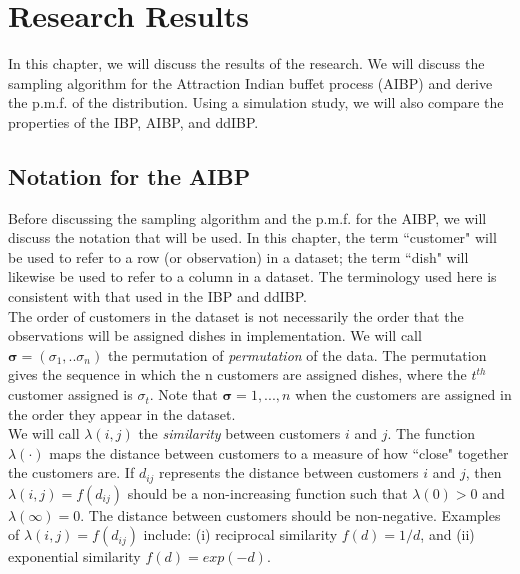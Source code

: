 \chapter{Research Results}
In this chapter, we will discuss the results of the research. We will discuss
the sampling algorithm for the Attraction Indian buffet process (AIBP) and
derive the p.m.f. of the distribution. Using a simulation study, we will also
compare the properties of the IBP, AIBP, and ddIBP.\\

\section{Notation for the AIBP}
Before discussing the sampling algorithm and the p.m.f. for the AIBP,  we will
discuss the notation that will be used. In this chapter, the term ``customer"
will be used to refer to a row (or observation) in a dataset; the term ``dish"
will likewise be used to refer to a column in a dataset. The terminology used
here is consistent with that used in the IBP and ddIBP.\\

\noindent
The order of customers in the dataset is not necessarily the order that the
observations will be assigned dishes in implementation. We will call $\bm
\sigma = (\sigma_1,..\sigma_n)$ the permutation of \textit{permutation} of the
data. The permutation gives the sequence in which the n customers are assigned
dishes, where the $t^{th}$ customer assigned is $\sigma_t$.  Note that $\bm
\sigma = {1,...,n}$ when the customers are assigned in the order they appear
in the dataset.\\

\noindent
We will call $\lambda(i,j)$ the \textit{similarity} between customers $i$ and
$j$. The function $\lambda(\cdot)$ maps the distance between customers to a
measure of how ``close" together the customers are. If $d_{ij}$ represents the
distance between customers $i$ and $j$, then $\lambda(i,j)=f(d_{ij})$ should be
a non-increasing function such that $\lambda(0)>0$ and $\lambda(\infty)=0$. The
distance between customers should be non-negative. Examples of
$\lambda(i,j)=f(d_{ij})$ include: (i) reciprocal similarity $f(d) = 1/d$, and
(ii) exponential similarity $f(d) = exp(-d)$.\\

